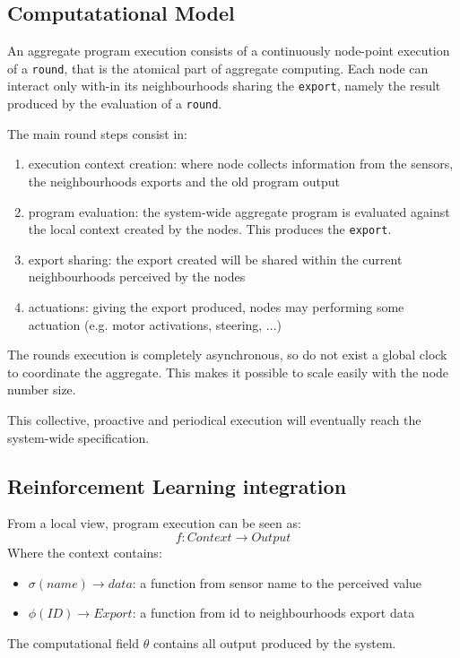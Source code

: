 \documentclass[conference]{IEEEtran}
\newcommand{\round}{\texttt{round}}
\newcommand{\export}{\texttt{export}}
\begin{document}
\subsection{Computatational Model}
An aggregate program execution consists of a continuously node-point execution of a \round{}, 
 that is the atomical part of aggregate computing.
%
Each node can interact only with-in its neighbourhoods sharing the \export{}, 
 namely the result produced by the evaluation of a \round{}.

The main round steps consist in:
\begin{enumerate}
  \item execution context creation: where node collects information from the sensors, the neighbourhoods exports and the old
  program output
  \item program evaluation: the system-wide aggregate program is evaluated against the local context created by the nodes. 
  This produces the \export{}.
  \item export sharing: the export created will be shared within the current neighbourhoods perceived by the nodes
  \item actuations: giving the export produced, nodes may performing some actuation (e.g. motor activations, steering, ...)
\end{enumerate}

The rounds execution is completely asynchronous, so do not exist a global clock to coordinate the aggregate. 
 This makes it possible to scale easily with the node number size.

This collective, proactive and periodical execution will eventually reach the system-wide specification.

\subsection{Reinforcement Learning integration}
From a local view, program execution can be seen as:
$$
f : \textit{Context} \rightarrow \textit{Output}
$$
Where the context contains:
\begin{itemize}
  \item $\sigma(name) \rightarrow \textit{data}$: a function from sensor name to the perceived value
  \item $\phi(\textit{ID}) \rightarrow \textit{Export}$: a function from id to neighbourhoods export data
\end{itemize}
The computational field $\theta$ contains all output produced by the system.
\end{document}
